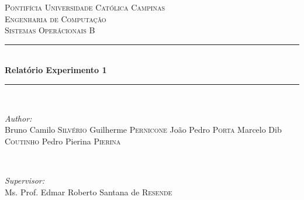 \begin{titlepage}

\newcommand{\HRule}{\rule{\linewidth}{0.5mm}} %

\center %
 

\textsc{\LARGE Pontifícia Universidade Católica Campinas}\\[1.5cm] %
\textsc{\Large Engenharia de Computação}\\[0.5cm] %
\textsc{\large Sistemas Operácionais B}\\[0.5cm] %


\HRule \\[0.4cm]
{ \huge \bfseries Relatório Experimento 1}\\[0.4cm] %
\HRule \\[1.5cm]
 

\begin{minipage}{0.4\textwidth}
\begin{flushleft} \large
\emph{Author:}\\
Bruno Camilo \textsc{Silvério}
Guilherme \textsc{Pernicone}
João Pedro \textsc{Porta}
Marcelo Dib \textsc{Coutinho}
Pedro Pierina \textsc{Pierina}
\end{flushleft}
\end{minipage}
~
\begin{minipage}{0.4\textwidth}
\begin{flushright} \large
\emph{Supervisor:} \\
Ms. Prof. Edmar Roberto Santana de \textsc{Resende} %
\end{flushright}
\end{minipage}\\[2cm]


\end{titlepage}
